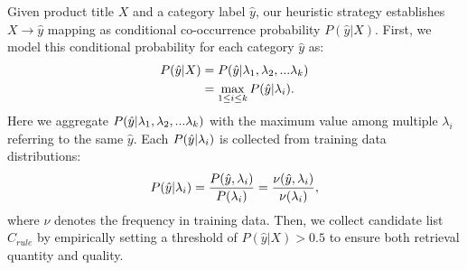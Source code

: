 Given product title $X$ and a category label $\hat{y}$, our heuristic strategy establishes $X \rightarrow \hat{y}$ mapping as conditional co-occurrence probability $P(\hat{y} | X)$. 
First, we model this conditional probability for each category $\hat{y}$ as:
\begin{equation}
    \begin{aligned}
    P(\hat{y} | X) &= P(\hat{y} \space | \space \lambda_1, \lambda_2, ... \lambda_k) \\ &= \max_{1 \leq i \leq k} P(\hat{y} \space | \space \lambda_i).
    \end{aligned}
\end{equation}
Here we aggregate $P(\hat{y} \space | \space \lambda_1, \lambda_2, ... \lambda_k)$ with the maximum value among multiple $\lambda_i$ referring to the same $\hat{y}$. Each $P(\hat{y} \space | \space \lambda_i)$ is collected from training data distributions:
\begin{equation}
P(\hat{y} \space | \space \lambda_i) = \frac{P(\hat{y} \space , \space \lambda_i)}{P({\lambda_i})} = \frac{\nu(\hat{y} \space , \space \lambda_i)}{\nu({\lambda_i})},
\end{equation}
where $\nu$ denotes the frequency in training data. Then, we collect candidate list ${C_{rule}}$ by empirically setting a threshold of $P(\hat{y} | X) > 0.5$ to ensure both retrieval quantity and quality. 

